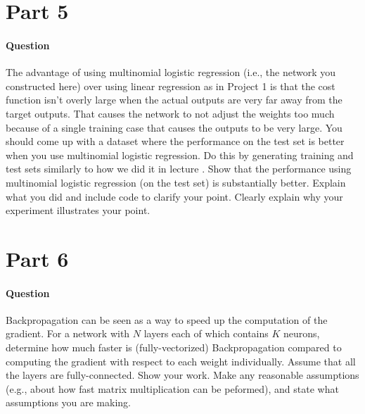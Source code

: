 \documentclass[11pt,twoside]{article}
\begin{document}
\clearpage

\section*{Part 5}
\paragraph{Question}
The advantage of using multinomial logistic regression (i.e., the network you constructed here) over using linear regression as in Project 1 is that the cost function isn’t overly large when the actual outputs are very far away from the target outputs. That causes the network to not adjust the weights too much because of a single training case that causes the outputs to be very large. You should come up with a dataset where the performance on the test set is better when you use multinomial logistic regression. Do this by generating training and test sets similarly to how we did it in lecture . Show that the performance using multinomial logistic regression (on the test set) is substantially better. Explain what you did and include code to clarify your point. Clearly explain why your experiment illustrates your point.

\clearpage

\section*{Part 6}
\paragraph{Question}
Backpropagation can be seen as a way to speed up the computation of the gradient. For a network with $N$ layers each of which contains $K$ neurons, determine how much faster is (fully-vectorized) Backpropagation compared to computing the gradient with respect to each weight individually. Assume that all the layers are fully-connected. Show your work. Make any reasonable assumptions (e.g., about how fast matrix multiplication can be peformed), and state what assumptions you are making.
\end{document}
